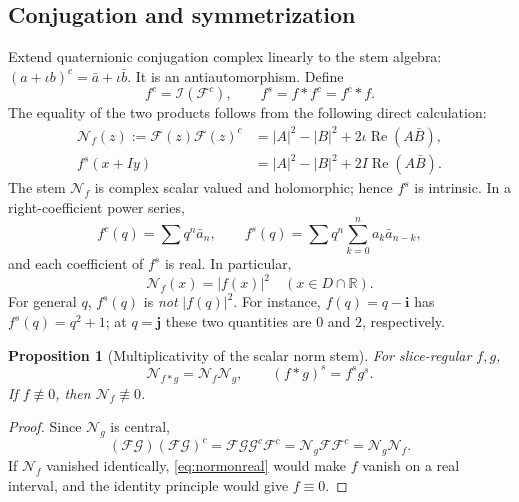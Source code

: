 \documentclass[11pt,a4paper]{article}
\numberwithin{equation}{section}
\newtheorem{proposition}[theorem]{Proposition}
\theoremstyle{definition}
\theoremstyle{remark}
\newcommand{\R}{\mathbb R}
\newcommand{\ii}{\mathbf i}
\newcommand{\jj}{\mathbf j}
\newcommand{\Rea}{\operatorname{Re}}
\newcommand{\Norm}{\mathcal N}
\newcommand{\cI}{\mathcal I}
\begin{document}
\subsection{Conjugation and symmetrization}
Extend quaternionic conjugation complex linearly to the stem algebra:
$(a+\iota b)^c=\bar a+\iota\bar b$. It is an antiautomorphism. Define
\[
 f^c=\cI(\mathcal F^c),\qquad f^s=f*f^c=f^c*f.
\]
The equality of the two products follows from the following direct calculation:
\begin{align}
 \Norm_f(z):=\mathcal F(z)\mathcal F(z)^c
 &=|A|^2-|B|^2+2\iota\Rea(A\bar B),\label{eq:normstem}\\
 f^s(x+Iy)&=|A|^2-|B|^2+2I\Rea(A\bar B).
 \label{eq:symmetrization}
\end{align}
The stem $\Norm_f$ is complex scalar valued and holomorphic; hence $f^s$ is
intrinsic. In a right-coefficient power series,
\[
 f^c(q)=\sum q^n\bar a_n,\qquad
 f^s(q)=\sum q^n\sum_{k=0}^n a_k\bar a_{n-k},
\]
and each coefficient of $f^s$ is real. In particular,
\begin{equation}
 \Norm_f(x)=|f(x)|^2\quad(x\in D\cap\R).
 \label{eq:normonreal}
\end{equation}
For general $q$, $f^s(q)$ is \emph{not} $|f(q)|^2$.
For instance, $f(q)=q-\ii$ has $f^s(q)=q^2+1$; at $q=\jj$ these two
quantities are $0$ and $2$, respectively.

\begin{proposition}[Multiplicativity of the scalar norm stem]
\label{prop:norm-multiplicative}
For slice-regular $f,g$,
\begin{equation}
 \Norm_{f*g}=\Norm_f\Norm_g,
 \qquad (f*g)^s=f^s g^s.
 \label{eq:norm-multiplicative}
\end{equation}
If $f\not\equiv0$, then $\Norm_f\not\equiv0$.
\end{proposition}
\begin{proof}
Since $\Norm_g$ is central,
\[
 (\mathcal F\mathcal G)(\mathcal F\mathcal G)^c
 =\mathcal F\mathcal G\mathcal G^c\mathcal F^c
 =\Norm_g\mathcal F\mathcal F^c=\Norm_g\Norm_f.
\]
If $\Norm_f$ vanished identically, \eqref{eq:normonreal} would make $f$ vanish
on a real interval, and the identity principle would give $f\equiv0$.
\end{proof}
\end{document}
